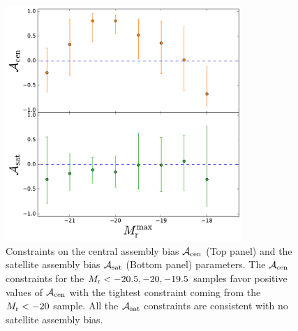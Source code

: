 \documentclass[12pt, preprint]{aastex}
\newcommand{\acen}{\mathcal{A}_{\rm cen}}
\newcommand{\asat}{\mathcal{A}_{\rm sat}}
\begin{document}
\begin{figure}[p]~\\
\begin{center}
\includegraphics[width=0.8\textwidth]{bias2.pdf}
\caption{Constraints on the central assembly bias $\acen$ (Top panel) and the satellite assembly bias $\asat$ (Bottom panel) parameters. The $\acen$ constraints for the $M_{\rm r} < -20.5, -20, -19.5$ samples favor positive values of $\acen$ with the tightest constraint coming from the $M_{\rm r} < -20$ sample. All the $\asat$ constraints are consistent with no satellite assembly bias.}
\label{fig:bias}
\end{center}
\end{figure}

\clearpage
\end{document}
